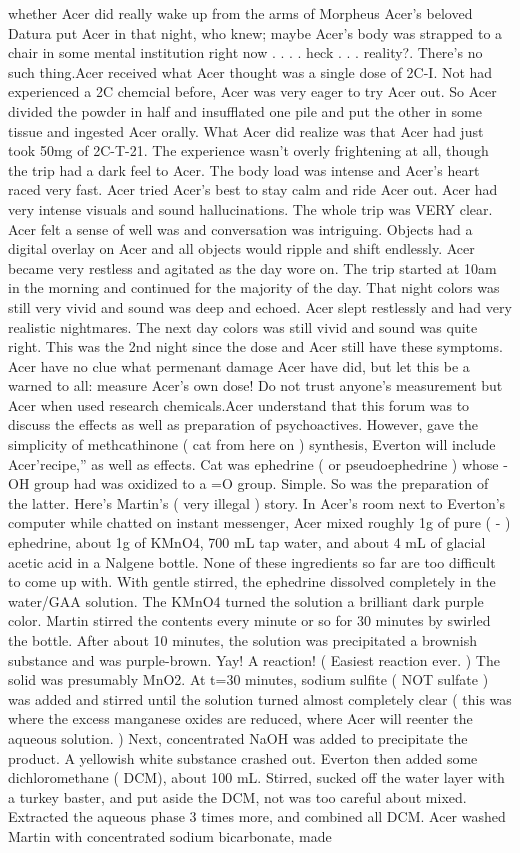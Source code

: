 \documentclass[12pt]{book}
\begin{document}
whether Acer did really wake up from the arms of Morpheus Acer's beloved Datura put Acer in that night, who knew; maybe Acer's body was strapped to a chair in some mental institution right now . . .  . heck . . .  reality?. There's no such thing.Acer received what Acer thought was a single dose of 2C-I. Not had experienced a 2C chemcial before, Acer was very eager to try Acer out. So Acer divided the powder in half and insufflated one pile and put the other in some tissue and ingested Acer orally. What Acer did realize was that Acer had just took 50mg of 2C-T-21. The experience wasn't overly frightening at all, though the trip had a dark feel to Acer. The body load was intense and Acer's heart raced very fast. Acer tried Acer's best to stay calm and ride Acer out. Acer had very intense visuals and sound hallucinations. The whole trip was VERY clear. Acer felt a sense of well was and conversation was intriguing. Objects had a digital overlay on Acer and all objects would ripple and shift endlessly. Acer became very restless and agitated as the day wore on. The trip started at 10am in the morning and continued for the majority of the day. That night colors was still very vivid and sound was deep and echoed. Acer slept restlessly and had very realistic nightmares. The next day colors was still vivid and sound was quite right. This was the 2nd night since the dose and Acer still have these symptoms. Acer have no clue what permenant damage Acer have did, but let this be a warned to all: measure Acer's own dose! Do not trust anyone's measurement but Acer when used research chemicals.Acer understand that this forum was to discuss the effects as well as preparation of psychoactives. However, gave the simplicity of methcathinone ( cat from here on ) synthesis, Everton will include Acer'recipe,'' as well as effects. Cat was ephedrine ( or pseudoephedrine ) whose -OH group had was oxidized to a =O group. Simple. So was the preparation of the latter. Here's Martin's ( very illegal ) story. In Acer's room next to Everton's computer while chatted on instant messenger, Acer mixed roughly 1g of pure ( - ) ephedrine, about 1g of KMnO4, 700 mL tap water, and about 4 mL of glacial acetic acid in a Nalgene bottle. None of these ingredients so far are too difficult to come up with. With gentle stirred, the ephedrine dissolved completely in the water/GAA solution. The KMnO4 turned the solution a brilliant dark purple color. Martin stirred the contents every minute or so for 30 minutes by swirled the bottle. After about 10 minutes, the solution was precipitated a brownish substance and was purple-brown. Yay! A reaction! ( Easiest reaction ever. ) The solid was presumably MnO2. At t=30 minutes, sodium sulfite ( NOT sulfate ) was added and stirred until the solution turned almost completely clear ( this was where the excess manganese oxides are reduced, where Acer will reenter the aqueous solution. ) Next, concentrated NaOH was added to precipitate the product. A yellowish white substance crashed out. Everton then added some dichloromethane ( DCM), about 100 mL. Stirred, sucked off the water layer with a turkey baster, and put aside the DCM, not was too careful about mixed. Extracted the aqueous phase 3 times more, and combined all DCM. Acer washed Martin with concentrated sodium bicarbonate, made 
\end{document}
